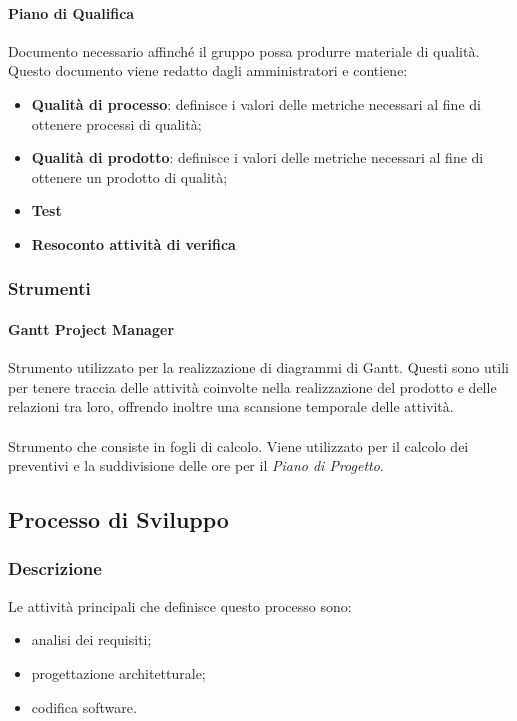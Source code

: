 		\paragraph{Piano di Qualifica}  \hfill \break
		Documento necessario affinché il gruppo possa produrre materiale di qualità. \\
    Questo documento viene redatto dagli amministratori e contiene:
		\begin{itemize}
			\item \textbf{Qualità di processo}: definisce i valori delle metriche necessari al fine di ottenere processi di qualità;
			\item \textbf{Qualità di prodotto}: definisce i valori delle metriche necessari al fine di ottenere un prodotto di qualità;
			\item \textbf{Test}
			\item \textbf{Resoconto attività di verifica}
		\end{itemize}
		
	\subsubsection{Strumenti}
		\paragraph{Gantt Project Manager} \hfill \break
		Strumento utilizzato per la realizzazione di diagrammi di Gantt. Questi sono utili per tenere traccia 
    delle attività coinvolte nella realizzazione del prodotto e delle relazioni
		tra loro, offrendo inoltre una scansione temporale delle attività.
    \paragraph{  } \hfill \break
    Strumento che consiste in fogli di calcolo. Viene utilizzato per il calcolo dei preventivi e la suddivisione delle ore per il \textit{Piano di Progetto}.
	
\subsection{Processo di Sviluppo}
	\subsubsection{Descrizione}
	Le attività principali che definisce questo processo sono:
  \begin{itemize}
    \item analisi dei requisiti;
    \item progettazione architetturale;
    \item codifica software.
  \end{itemize}
		
